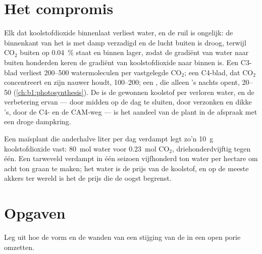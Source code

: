 \section{Het compromis}

\begin{proposition}[Watergebruiksefficiëntie]\label{prop:b1:plant-transport:wue}
Elk  dat koolstofdioxide binnenlaat verliest water, en de ruil is
ongelijk: de binnenkant van het  is met damp verzadigd en de lucht
buiten is droog, terwijl $\mathrm{CO_2}$ buiten op \qty{0.04}{\%} staat en
binnen lager, zodat de gradiënt van water naar buiten honderden keren de
gradiënt van koolstofdioxide naar binnen is. Een C3-blad verliest
\qtyrange{200}{500}{} watermoleculen per vastgelegde $\mathrm{CO_2}$; een
C4-blad, dat $\mathrm{CO_2}$ concentreert en zijn  nauwer houdt,
\qtyrange{100}{200}{}; een , die alleen 's nachts opent,
\qtyrange{20}{50}{} (\cref{ch:b1:photosynthesis}). De
\emph{} is de gewonnen koolstof per verloren water,
en de verbetering ervan --- door midden op de dag te sluiten, door verzonken
 en dikke 's, door de C4- en de CAM-weg --- is het
aandeel van de plant in de afspraak met een droge dampkring.
\end{proposition}

\begin{example}\label{ex:b1:plant-transport:bargain}
Een maïsplant die anderhalve liter per dag verdampt legt zo'n \qty{10}{g}
koolstofdioxide vast: \qty{80}{mol} water voor \qty{0.23}{mol}
$\mathrm{CO_2}$, driehonderdvijftig tegen één. Een tarweveld verdampt in
één seizoen vijfhonderd ton water per hectare om acht ton graan te maken;
het water is de prijs van de koolstof, en op de meeste akkers ter wereld is
het de prijs die de oogst begrenst.
\end{example}

\section{Opgaven}

\begin{exercise}[$\star$]\label{exo:b1:plant-transport:1}
Leg uit hoe de vorm en de wanden van  een stijging van de 
in een open porie omzetten.
\end{exercise}

